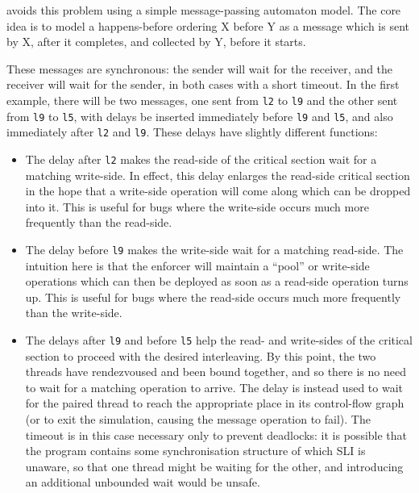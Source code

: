 {\Technique} avoids this problem using a simple message-passing
automaton model.  The core idea is to model a happens-before ordering
X before Y as a message which is sent by X, after it completes, and
collected by Y, before it starts.

These messages are synchronous: the sender will
wait for the receiver, and the receiver will wait for the sender, in
both cases with a short timeout.  In the first example, there will be
two messages, one sent from \verb|l2| to \verb|l9| and the other sent
from \verb|l9| to \verb|l5|, with delays be inserted immediately
before \verb|l9| and \verb|l5|, and also immediately after \verb|l2|
and \verb|l9|.  These delays have slightly different functions:

\begin{itemize}
\item
  The delay after \verb|l2| makes the read-side of the critical
  section wait for a matching write-side.  In effect, this delay
  enlarges the read-side critical section in the hope that a
  write-side operation will come along which can be dropped into it.
  This is useful for bugs where the write-side occurs much more
  frequently than the read-side.
\item
  The delay before \verb|l9| makes the write-side wait for a matching
  read-side.  The intuition here is that the enforcer will maintain a
  ``pool'' or write-side operations which can then be deployed as soon
  as a read-side operation turns up.  This is useful for bugs where
  the read-side occurs much more frequently than the write-side.
\item
  The delays after \verb|l9| and before \verb|l5| help the read- and
  write-sides of the critical section to proceed with the desired
  interleaving.  By this point, the two threads have rendezvoused and
  been bound together, and so there is no need to wait for a matching
  operation to arrive.  The delay is instead used to wait for the
  paired thread to reach the appropriate place in its control-flow
  graph (or to exit the simulation, causing the message operation to
  fail).  The timeout is in this case necessary only to prevent
  deadlocks: it is possible that the program contains some
  synchronisation structure of which SLI is unaware, so that one
  thread might be waiting for the other, and introducing an additional
  unbounded wait would be unsafe.

\end{itemize}

